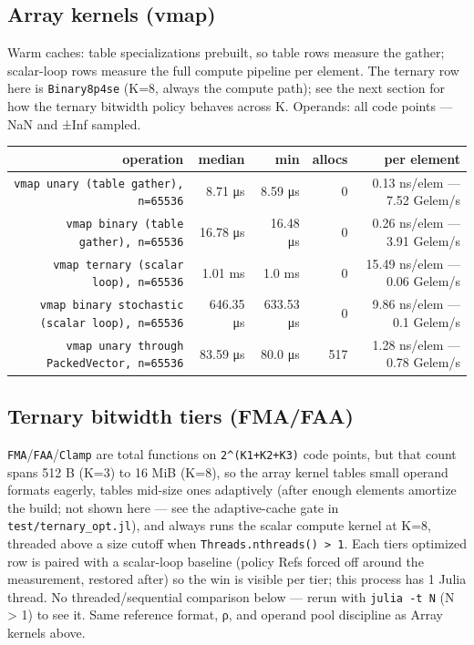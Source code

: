 \subsection{Array kernels (vmap)}



\label{14819160431636425252}{}


Warm caches: table specializations prebuilt, so table rows measure the gather; scalar-loop rows measure the full compute pipeline per element. The ternary row here is \texttt{Binary8p4se} (K=8, always the compute path); see the next section for how the ternary bitwidth policy behaves across K. Operands: all code points — NaN and ±Inf sampled.




\begin{table}[h]
\centering
\begin{tabulary}{\linewidth}{R R R R R}
\toprule
operation & median & min & allocs & per element \\
\toprule
\texttt{vmap unary (table gather), n=65536} & 8.71 μs & 8.59 μs & 0 & 0.13 ns/elem — 7.52 Gelem/s \\
\texttt{vmap binary (table gather), n=65536} & 16.78 μs & 16.48 μs & 0 & 0.26 ns/elem — 3.91 Gelem/s \\
\texttt{vmap ternary (scalar loop), n=65536} & 1.01 ms & 1.0 ms & 0 & 15.49 ns/elem — 0.06 Gelem/s \\
\texttt{vmap binary stochastic (scalar loop), n=65536} & 646.35 μs & 633.53 μs & 0 & 9.86 ns/elem — 0.1 Gelem/s \\
\texttt{vmap unary through PackedVector, n=65536} & 83.59 μs & 80.0 μs & 517 & 1.28 ns/elem — 0.78 Gelem/s \\
\bottomrule
\end{tabulary}

\end{table}



\subsection{Ternary bitwidth tiers (FMA/FAA)}



\label{14443973703327008650}{}


\texttt{FMA}/\texttt{FAA}/\texttt{Clamp} are total functions on \texttt{2{\textasciicircum}(K1+K2+K3)} code points, but that count spans 512 B (K=3) to 16 MiB (K=8), so the array kernel tables small operand formats eagerly, tables mid-size ones adaptively (after enough elements amortize the build; not shown here — see the adaptive-cache gate in \texttt{test/ternary\_opt.jl}), and always runs the scalar compute kernel at K=8, threaded above a size cutoff when \texttt{Threads.nthreads() > 1}. Each tier{\textquotesingle}s optimized row is paired with a scalar-loop baseline (policy Refs forced off around the measurement, restored after) so the win is visible per tier; this process has 1 Julia thread. No threaded/sequential comparison below — rerun with \texttt{julia -t N} (N > 1) to see it. Same reference format, ρ, and operand pool discipline as Array kernels above.




